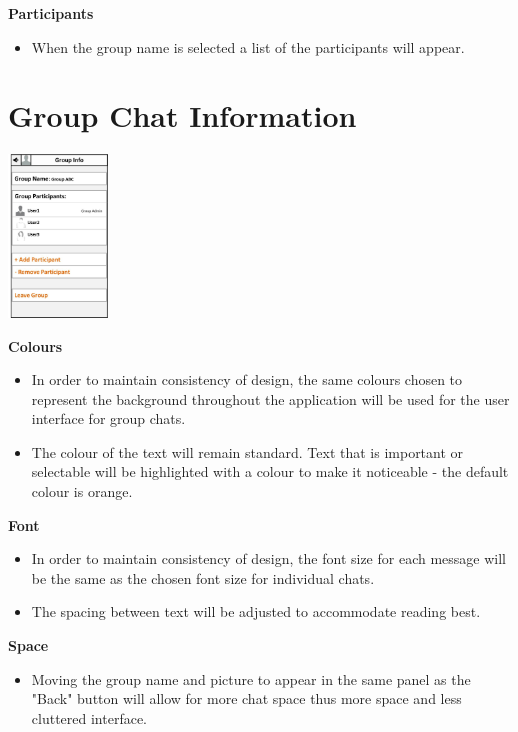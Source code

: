 \documentclass[11pt]{article}
\begin{document}
\textbf{Participants}\\
\begin{itemize}
\item	When the group name is selected a list of the participants will appear.
\end{itemize}

\newpage
\section{Group Chat Information}
\centerline{\includegraphics[width=100px]{SettingF.jpg}}

\textbf{Colours}\\
\begin{itemize}
\item	In order to maintain consistency of design, the same colours chosen to represent the background throughout the application will be used for the user interface for group chats.
\item	The colour of the text will remain standard. Text that is important or selectable will be highlighted with a colour to make it noticeable - the default colour is orange. 	\\
\end{itemize}

\textbf{Font}\\
\begin{itemize}
\item	In order to maintain consistency of design, the font size for each message will be the same as the chosen font size for individual chats.
\item The spacing between text will be adjusted to accommodate reading best.\\
\end{itemize}

\textbf{Space}\\
\begin{itemize}
\item	Moving the group name and picture to appear in the same panel as the "Back" button will allow for more chat space thus more space and less cluttered interface.
\end{itemize}
\end{document}

